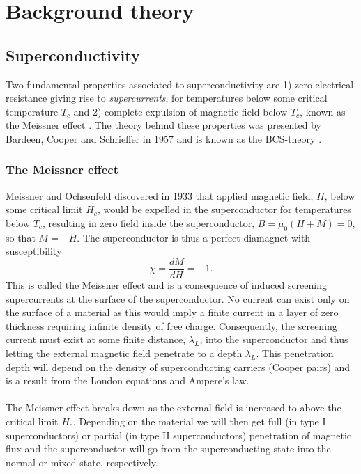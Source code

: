 \chapter{Background theory}

\section{Superconductivity}
Two fundamental properties associated to superconductivity are 1) zero electrical resistance giving rise to \textit{supercurrents}, for temperatures below some critical temperature $T_c$ and 2) complete expulsion of magnetic field below $T_c$, known as the Meissner effect \cite{Meissner33,MeissnerTrans83}. The theory behind these properties was presented by Bardeen, Cooper and Schrieffer in 1957 and is known as the BCS-theory \cite{BCS57}. 


\subsection{The Meissner effect}\label{sec:meissner}
Meissner and Ochsenfeld discovered in 1933 \cite{Meissner33} that applied magnetic field, $H$, below some critical limit $H_c$, would be expelled in the superconductor for temperatures below $T_c$, resulting in zero field inside the superconductor, $B=\mu_0(H + M)=0$, so that $M=-H$. The superconductor is thus a perfect diamagnet with susceptibility 
\begin{equation}
    \chi = \frac{dM}{dH} = -1.
\end{equation}
This is called the Meissner effect and is a consequence of induced screening supercurrents at the surface of the superconductor. No current can exist only on the surface of a material as this would imply a finite current in a layer of zero thickness requiring infinite density of free charge. Consequently, the screening current must exist at some finite distance, $\lambda_L$, into the superconductor and thus letting the external magnetic field penetrate to a depth $\lambda_L$. This penetration depth will depend on the density of superconducting carriers (Cooper pairs) and is a result from the London equations \cite{London71} and Ampere's law.
\\
\\
The Meissner effect breaks down as the external field is increased to above the critical limit $H_c$. Depending on the material we will then get full (in type I superconductors) or partial (in type II superconductors) penetration of magnetic flux and the superconductor will go from the superconducting state into the normal or mixed state, respectively.


